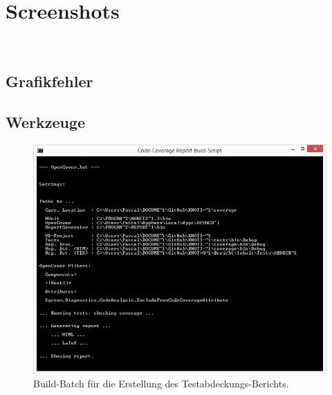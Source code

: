 %



\section{Screenshots}
\label{Anhang:Aufnahmen}


~\\


\subsection*{Grafikfehler}



\newpage



\subsection*{Werkzeuge}



\begin{figure}[ht]

	\centering
	
	\includegraphics[width=\textwidth]{Inhalt/Anhang/Grafiken/Werkzeuge/Code-Coverage Report Build-Script.png}
	
	\caption{Build-Batch für die Erstellung des Testabdeckungs-Berichts.}

\end{figure}








